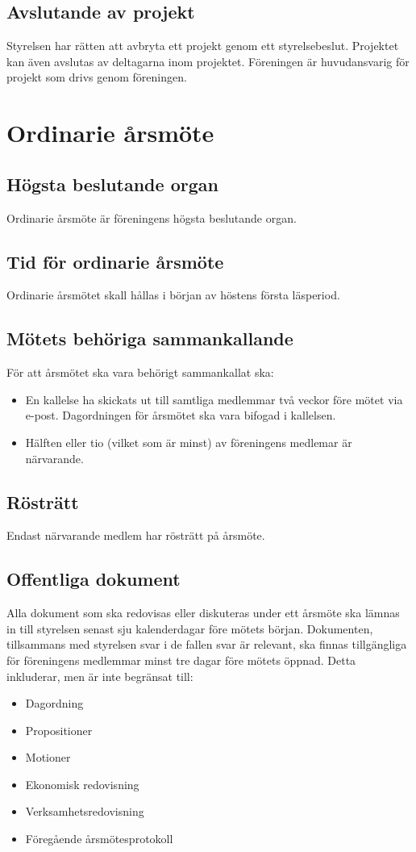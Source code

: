 \documentclass[11pt,a4paper]{article}
\begin{document}
\subsection{Avslutande av projekt}
Styrelsen har rätten att avbryta ett projekt genom ett styrelsebeslut.
Projektet kan även avslutas av deltagarna inom projektet. Föreningen är
huvudansvarig för projekt som drivs genom föreningen.



\section{Ordinarie årsmöte}

\subsection{Högsta beslutande organ}
Ordinarie årsmöte är föreningens högsta beslutande organ.
\subsection{Tid för ordinarie årsmöte}
Ordinarie årsmötet skall hållas i början av höstens första läsperiod. 
\subsection{Mötets behöriga sammankallande}
För att årsmötet ska vara behörigt sammankallat ska:
\begin{itemize}
\item En kallelse ha skickats ut till samtliga medlemmar två veckor före mötet via e-post. Dagordningen för årsmötet ska vara bifogad i kallelsen. 
\item Hälften eller tio (vilket som är minst) av föreningens medlemar är
närvarande.
\end{itemize}
\subsection{Rösträtt}
Endast närvarande medlem har rösträtt på årsmöte.
\subsection{Offentliga dokument}
Alla dokument som ska redovisas eller diskuteras under ett årsmöte ska
lämnas in till styrelsen senast sju kalenderdagar före mötets början.
Dokumenten, tillsammans med styrelsen svar i de fallen svar är relevant,
ska finnas tillgängliga för föreningens medlemmar minst tre dagar före
mötets öppnad. Detta inkluderar, men är inte begränsat till:
\begin{itemize}
\item Dagordning
\item Propositioner
\item Motioner
\item Ekonomisk redovisning
\item Verksamhetsredovisning
\item Föregående årsmötesprotokoll
\end{itemize}
\end{document}
